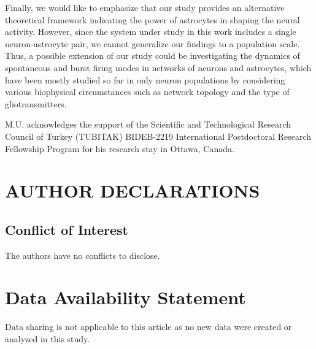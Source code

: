 \documentclass[%
 aip,
 amsmath,amssymb,
 reprint,%
]{revtex4-1}
\begin{document}
Finally, we would like to emphasize that our study provides an alternative theoretical framework indicating the power of astrocytes in shaping the neural activity. However, since the system under study in this work includes a single neuron-astrocyte pair, we cannot generalize our findings to a population scale. Thus, a possible extension of our study could be investigating the dynamics of spontaneous and burst firing modes in networks of neurons and astrocytes, which have been mostly studied so far in only neuron populations \cite{ma2017, bera2019} by considering various biophysical circumstances such as network topology and the type of gliotransmitters. 


\begin{acknowledgments}
M.U. acknowledges the support of the Scientific and Technological Research Council of Turkey (TUBITAK) BIDEB-2219 International Postdoctoral Research Fellowship Program for his research stay in Ottawa, Canada.
\end{acknowledgments}

\section*{AUTHOR DECLARATIONS}

\subsection*{Conflict of Interest}

The authors have no conflicts to disclose.



\section*{Data Availability Statement}

Data sharing is not applicable to this article as no new data were created or analyzed in this study.





\nocite{*}
\end{document}
